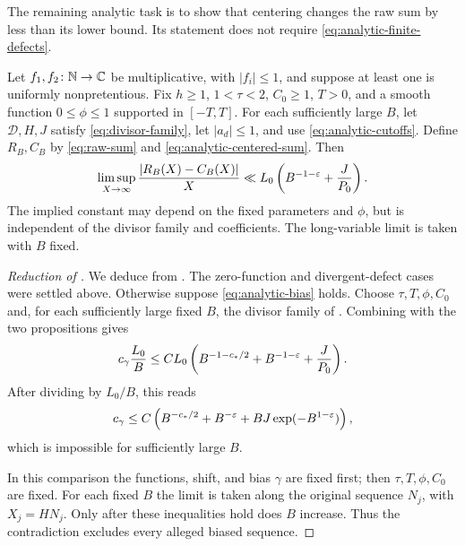 The remaining analytic task is to show that centering changes the raw
sum by less than its lower bound. Its statement does not require
\eqref{eq:analytic-finite-defects}.

\begin{proposition}
\label{prop:analytic-centering}
Let $f_1,f_2\colon\mathbb N\to\mathbb C$ be multiplicative, with $|f_i|\le1$, and
suppose at least one is uniformly nonpretentious. Fix
$h\ge1$, $1<\tau<2$, $C_0\ge1$, $T>0$, and a smooth function
$0\le\phi\le1$ supported in $[-T,T]$.
For each sufficiently large $B$, let $\mathcal D,H,J$ satisfy
\eqref{eq:divisor-family}, let $|a_d|\le1$, and use
\eqref{eq:analytic-cutoffs}. Define $R_B,C_B$ by
\eqref{eq:raw-sum} and \eqref{eq:analytic-centered-sum}. Then
\begin{equation}\label{eq:analytic-centering-bound}
 \limsup_{X\to\infty}\frac{|R_B(X)-C_B(X)|}{X}
 \ll L_0\left(B^{-1-\varepsilon}+\frac{J}{P_0}\right).
\end{equation}
The implied constant may depend on the fixed parameters and $\phi$,
but is independent of the divisor family and coefficients.
The long-variable limit is taken with $B$ fixed.
\end{proposition}

\begin{proof}[Reduction of ]
We deduce  from
.
The zero-function and divergent-defect cases were settled above.
Otherwise suppose \eqref{eq:analytic-bias} holds. Choose
$\tau,T,\phi,C_0$ and, for each sufficiently large fixed $B$, the divisor
family of . Combining  with
the two propositions gives
\[
 c_\gamma\frac{L_0}{B}
 \le C L_0\left(B^{-1-c_*/2}+B^{-1-\varepsilon}+\frac{J}{P_0}\right).
\]
After dividing by $L_0/B$, this reads
\begin{equation}\label{eq:analytic-contradiction}
 c_\gamma\le C\left(B^{-c_*/2}+B^{-\varepsilon}
             +BJ\exp(-B^{1-\varepsilon})\right),
\end{equation}
which is impossible for sufficiently large $B$.

In this comparison the functions, shift, and bias $\gamma$ are fixed
first; then $\tau,T,\phi,C_0$ are fixed. For each fixed $B$ the limit
is taken along the original sequence $N_j$, with $X_j=HN_j$.
Only after these inequalities hold does $B$ increase.
Thus the contradiction excludes every alleged biased sequence.
\end{proof}

